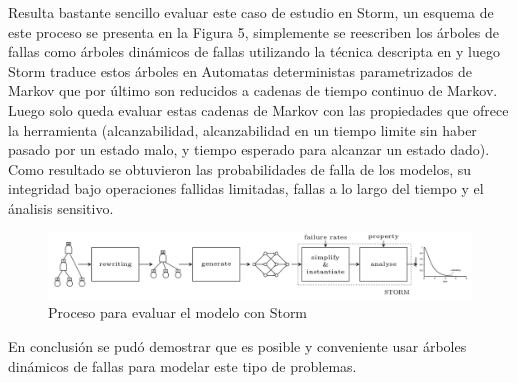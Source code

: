 \documentclass[11pt]{article}
\begin{document}
Resulta bastante sencillo evaluar este caso de estudio en Storm, un esquema de este proceso se presenta en la Figura 5, simplemente se reescriben los \'arboles de fallas como \'arboles din\'amicos de fallas utilizando la t\'ecnica descripta en \cite{Tree} y luego Storm traduce estos \'arboles en Automatas deterministas parametrizados de Markov que por \'ultimo son reducidos a cadenas de tiempo continuo de Markov. Luego solo queda evaluar estas cadenas de Markov con las propiedades que ofrece la herramienta (alcanzabilidad, alcanzabilidad en un tiempo limite sin haber pasado por un estado malo, y tiempo esperado para alcanzar un estado dado). Como resultado se obtuvieron las probabilidades de falla de los modelos, su integridad bajo operaciones fallidas limitadas, fallas a lo largo del tiempo y el \'analisis sensitivo. %


\begin{figure}[h]
	\includegraphics[scale=0.3]{stormapproach.png} 
	\centering
	\caption{Proceso para evaluar el modelo con Storm}%
\end{figure}

En conclusi\'on se pud\'o demostrar que es posible y conveniente usar \'arboles din\'amicos de fallas para modelar este tipo de problemas.


\end{document}
